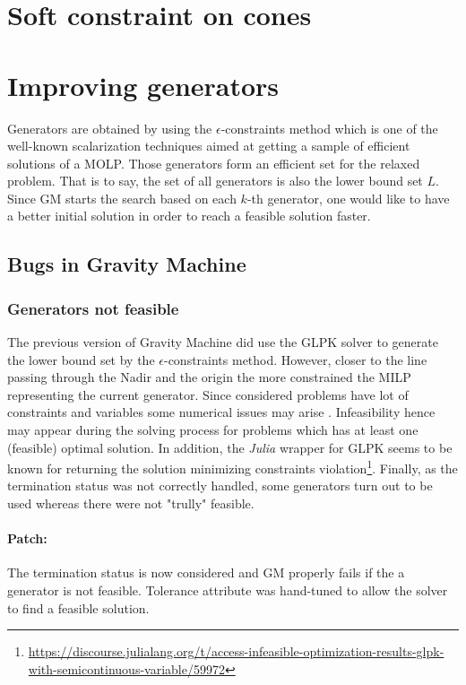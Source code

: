 \section{Soft constraint on cones}


\section{Improving generators}
Generators are obtained by using the $\epsilon$-constraints method which is one of the well-known scalarization techniques \cite{Chankong1983MultiobjectiveDM} aimed at getting a sample of efficient solutions of a MOLP. Those generators form an efficient set for the relaxed problem. That is to say, the set of all generators is also the lower bound set $L$. Since GM starts the search based on each $k$-th generator, one would like to have a better initial solution in order to reach a feasible solution faster.

\subsection{Bugs in Gravity Machine}
\subsubsection*{Generators not feasible}
The previous version of Gravity Machine did use the GLPK solver to generate the lower bound set by the $\epsilon$-constraints method. 
However, closer to the line passing through the Nadir and the origin the more constrained the MILP representing the current generator. 
Since considered problems have lot of constraints and variables some numerical issues may arise \cite{gurobiNumIssues}. Infeasibility hence
may appear during the solving process for problems which has at least one (feasible) optimal solution. In addition, the \textit{Julia} wrapper
for GLPK seems to be known for returning the solution minimizing constraints violation\footnote{\url{https://discourse.julialang.org/t/access-infeasible-optimization-results-glpk-with-semicontinuous-variable/59972}}.
Finally, as the termination status was not correctly handled, some generators turn out to be used whereas there were not "trully" feasible.  
\paragraph*{Patch:}
The termination status is now considered and GM properly fails if the a generator is not feasible. 
Tolerance attribute was hand-tuned to allow the solver to find a feasible solution.
\cite{bench_solver}
